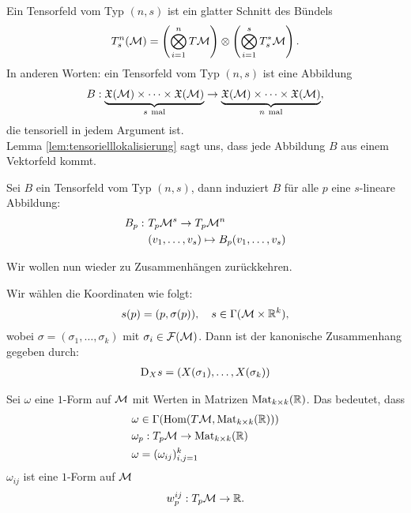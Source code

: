 \begin{defs}[Tensorfeld]
Ein Tensorfeld vom Typ $(n, s)$ ist ein glatter Schnitt des Bündels
\begin{align*}
T^{n}_{s} (\mathcal{M}) = \left( \bigotimes^n_{i=1} T \mathcal{M} \right) \otimes \left(\bigotimes^s_{i=1} T_s^* \mathcal{M}\right).
\end{align*}
In anderen Worten: ein Tensorfeld vom Typ $(n, s)$ ist eine Abbildung
\begin{align*}
B : \underbrace{\mathfrak{X}(\mathcal{M}) \times \cdots \times \mathfrak{X}(\mathcal{M})}_{s \ \mathrm{mal}} \to \underbrace{\mathfrak{X}(\mathcal{M}) \times \cdots \times \mathfrak{X}(\mathcal{M})}_{n \ \mathrm{mal}},
\end{align*}
die tensoriell in jedem Argument ist.\\
Lemma \ref{lem:tensorielllokalisierung} sagt uns, dass jede Abbildung $B$ aus einem Vektorfeld kommt.
\end{defs}
\begin{kor}
Sei $B$ ein Tensorfeld vom Typ $(n, s)$, dann induziert $B$ für alle $p$ eine $s$-lineare Abbildung:
\begin{align*}
B_p: \ & T_p \mathcal{M}^s \to T_p \mathcal{M}^n\\
&(v_1, \dots, v_s) \mapsto B_p (v_1, \dots, v_s)
\end{align*}
\end{kor}

Wir wollen nun wieder zu Zusammenhängen zurückkehren.
\begin{bsp}
Wir wählen die Koordinaten wie folgt:
\begin{align}
s(p) = (p, \sigma(p)), \quad s \in \Gamma(\mathcal{M} \times \mathbb{R}^k),
\end{align}
wobei $\sigma = (\sigma_1, \dots, \sigma_k)$ mit $\sigma_i \in \mathcal{F}(\mathcal{M})$.
Dann ist der kanonische Zusammenhang gegeben durch:
\begin{align}
\mathrm{D}_X s = (X(\sigma_1), \dots, X(\sigma_k))
\end{align}
\end{bsp}

Sei $\omega$ eine $1$-Form auf $\mathcal{M}$ mit Werten in Matrizen $\mathrm{Mat}_{k \times k}(\mathbb{R})$.
Das bedeutet, dass
\begin{align*}
&\omega \in \Gamma(\mathrm{Hom}(T\mathcal{M}, \mathrm{Mat}_{k \times k}(\mathbb{R}))) \\
&\omega_p: T_p \mathcal{M} \to \mathrm{Mat}_{k \times k}(\mathbb{R}) \\
&\omega = (\omega_{ij})^k_{i,j=1}
\end{align*}
$\omega_{ij}$ ist eine $1$-Form auf $\mathcal{M}$
\begin{align*}
w^{ij}_p :T_p \mathcal{M} \to \mathbb{R}.
\end{align*}


